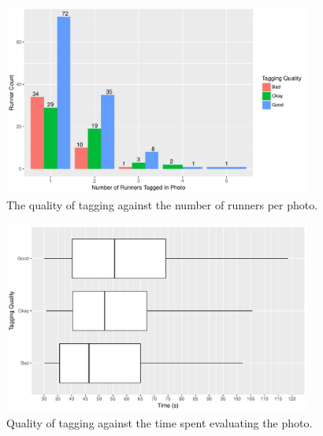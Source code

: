\begin{figure}[p]
  \centering
  \includegraphics[width=0.9\textwidth]{images/dataset/argus/quality_of_tagging_count}
  \caption[Quality of tagging related the number of runners per photo]{The quality of tagging against the number of runners per photo.}
  \label{fig:dataset:argus:quality_of_tagging_count}
\end{figure}

\begin{figure}[p]
  \centering
  \includegraphics[width=0.9\textwidth]{images/dataset/argus/quality_of_tagging_time}
  \caption[Quality of tagging and seconds evaluating the photo]{Quality of tagging against the time spent evaluating the photo.}
  \label{fig:dataset:argus:quality_of_tagging_count}
\end{figure}

\clearpage